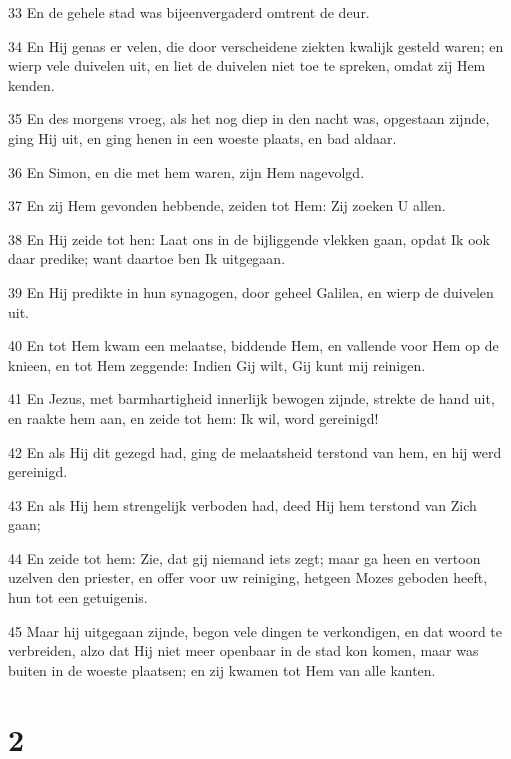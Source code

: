 \par 33 En de gehele stad was bijeenvergaderd omtrent de deur.
\par 34 En Hij genas er velen, die door verscheidene ziekten kwalijk gesteld waren; en wierp vele duivelen uit, en liet de duivelen niet toe te spreken, omdat zij Hem kenden.
\par 35 En des morgens vroeg, als het nog diep in den nacht was, opgestaan zijnde, ging Hij uit, en ging henen in een woeste plaats, en bad aldaar.
\par 36 En Simon, en die met hem waren, zijn Hem nagevolgd.
\par 37 En zij Hem gevonden hebbende, zeiden tot Hem: Zij zoeken U allen.
\par 38 En Hij zeide tot hen: Laat ons in de bijliggende vlekken gaan, opdat Ik ook daar predike; want daartoe ben Ik uitgegaan.
\par 39 En Hij predikte in hun synagogen, door geheel Galilea, en wierp de duivelen uit.
\par 40 En tot Hem kwam een melaatse, biddende Hem, en vallende voor Hem op de knieen, en tot Hem zeggende: Indien Gij wilt, Gij kunt mij reinigen.
\par 41 En Jezus, met barmhartigheid innerlijk bewogen zijnde, strekte de hand uit, en raakte hem aan, en zeide tot hem: Ik wil, word gereinigd!
\par 42 En als Hij dit gezegd had, ging de melaatsheid terstond van hem, en hij werd gereinigd.
\par 43 En als Hij hem strengelijk verboden had, deed Hij hem terstond van Zich gaan;
\par 44 En zeide tot hem: Zie, dat gij niemand iets zegt; maar ga heen en vertoon uzelven den priester, en offer voor uw reiniging, hetgeen Mozes geboden heeft, hun tot een getuigenis.
\par 45 Maar hij uitgegaan zijnde, begon vele dingen te verkondigen, en dat woord te verbreiden, alzo dat Hij niet meer openbaar in de stad kon komen, maar was buiten in de woeste plaatsen; en zij kwamen tot Hem van alle kanten.

\chapter{2}

